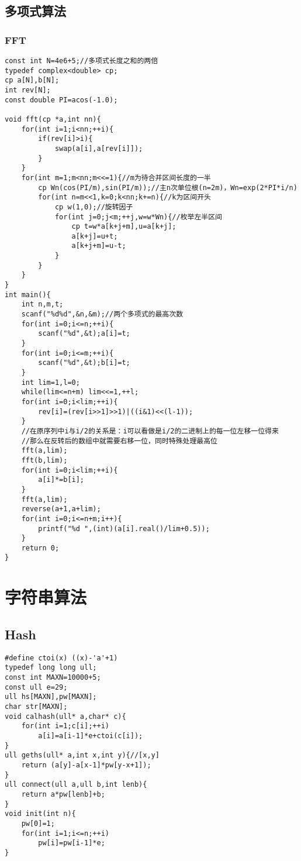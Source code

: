 \documentclass[UTF8]{ctexart}
\begin{document}
\subsection{多项式算法}
\subsubsection{FFT}
\begin{lstlisting}  
const int N=4e6+5;//多项式长度之和的两倍 
typedef complex<double> cp;
cp a[N],b[N];
int rev[N];
const double PI=acos(-1.0);

void fft(cp *a,int nn){
    for(int i=1;i<nn;++i){
        if(rev[i]>i){
            swap(a[i],a[rev[i]]);
        }
    }
    for(int m=1;m<nn;m<<=1){//m为待合并区间长度的一半 
        cp Wn(cos(PI/m),sin(PI/m));//主n次单位根(n=2m)，Wn=exp(2*PI*i/n) 
        for(int n=m<<1,k=0;k<nn;k+=n){//k为区间开头 
            cp w(1,0);//旋转因子 
            for(int j=0;j<m;++j,w=w*Wn){//枚举左半区间 
                cp t=w*a[k+j+m],u=a[k+j];
                a[k+j]=u+t;
                a[k+j+m]=u-t;
            }
        }
    }
}
int main(){
    int n,m,t;
    scanf("%d%d",&n,&m);//两个多项式的最高次数 
    for(int i=0;i<=n;++i){
        scanf("%d",&t);a[i]=t;	
    }
    for(int i=0;i<=m;++i){
        scanf("%d",&t);b[i]=t;
    }
    int lim=1,l=0;
    while(lim<=n+m) lim<<=1,++l;
    for(int i=0;i<lim;++i){
        rev[i]=(rev[i>>1]>>1)|((i&1)<<(l-1));
    }
    //在原序列中i与i/2的关系是：i可以看做是i/2的二进制上的每一位左移一位得来
    //那么在反转后的数组中就需要右移一位，同时特殊处理最高位 
    fft(a,lim);
    fft(b,lim);
    for(int i=0;i<lim;++i){
        a[i]*=b[i];
    }
    fft(a,lim);
    reverse(a+1,a+lim);
    for(int i=0;i<=n+m;i++){
        printf("%d ",(int)(a[i].real()/lim+0.5));
    }
    return 0;
}
\end{lstlisting}
\section{字符串算法}
\subsection{Hash}
\begin{lstlisting}
#define ctoi(x) ((x)-'a'+1)
typedef long long ull;
const int MAXN=10000+5;
const ull e=29;
ull hs[MAXN],pw[MAXN];
char str[MAXN];
void calhash(ull* a,char* c){
    for(int i=1;c[i];++i)
        a[i]=a[i-1]*e+ctoi(c[i]);
}
ull geths(ull* a,int x,int y){//[x,y]
    return (a[y]-a[x-1]*pw[y-x+1]);
}
ull connect(ull a,ull b,int lenb){
    return a*pw[lenb]+b;
}
void init(int n){
    pw[0]=1;
    for(int i=1;i<=n;++i)
        pw[i]=pw[i-1]*e;
}    
\end{lstlisting}
\end{document}
